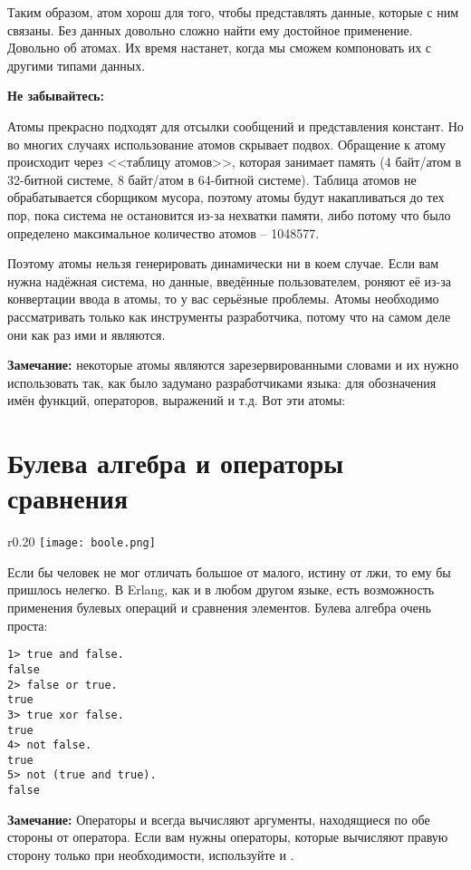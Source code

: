 Таким образом, атом хорош для того, чтобы представлять данные, которые с ним связаны.
Без данных довольно сложно найти ему достойное применение.
Довольно об атомах.
Их время настанет, когда мы сможем компоновать их с другими типами данных.\\ 
\colorbox{lorange}
{
    \begin{minipage}{1.0\linewidth}
\textbf{Не забывайтесь:}

Атомы прекрасно подходят для отсылки сообщений и представления констант.
Но во многих случаях использование атомов скрывает подвох.
Обращение к атому происходит через <<таблицу атомов>>, которая занимает память (4 байт/атом в 32\--битной системе, 8 байт/атом в 64\--битной системе).
Таблица атомов не обрабатывается сборщиком мусора, поэтому атомы будут накапливаться до тех пор, пока система не остановится из\--за нехватки памяти, либо потому что было определено максимальное количество атомов \--- 1048577.

Поэтому атомы нельзя генерировать динамически ни в коем случае.
Если вам нужна надёжная система, но данные, введённые пользователем, роняют её из\--за конвертации ввода в атомы, то у вас серьёзные проблемы.
Атомы необходимо рассматривать только как инструменты разработчика, потому что на самом деле они как раз ими и являются.
\end{minipage}
}
\colorbox{lgray}{
    \begin{minipage}{1.0\linewidth}
    \textbf{Замечание:} некоторые атомы являются зарезервированными словами и их нужно использовать так, как было задумано разработчиками языка: для обозначения имён функций, операторов, выражений и т.д.
    Вот эти атомы: 
\end{minipage}
}
\section{Булева алгебра и операторы сравнения}\label{boolandcompare}
\begin{wrapfigure}[7]{r}{0.20\linewidth}
    \texttt{[image: boole.png]}
\end{wrapfigure}
Если бы человек не мог отличать большое от малого, истину от лжи, то ему бы пришлось нелегко.
В Erlang, как и в любом другом языке, есть возможность применения булевых операций и сравнения элементов.
Булева алгебра очень проста:\\ 
\begin{lstlisting}[style=repl]
1> true and false.
false
2> false or true.
true
3> true xor false.
true
4> not false.
true
5> not (true and true).
false
\end{lstlisting} 
\colorbox{lgray}
{
    \begin{minipage}{1.0\linewidth}
        \textbf{Замечание:} Операторы  и  всегда вычисляют аргументы, находящиеся по обе стороны от оператора.
        Если вам нужны операторы, которые вычисляют правую сторону только при необходимости, используйте  и .
    \end{minipage}
} 

